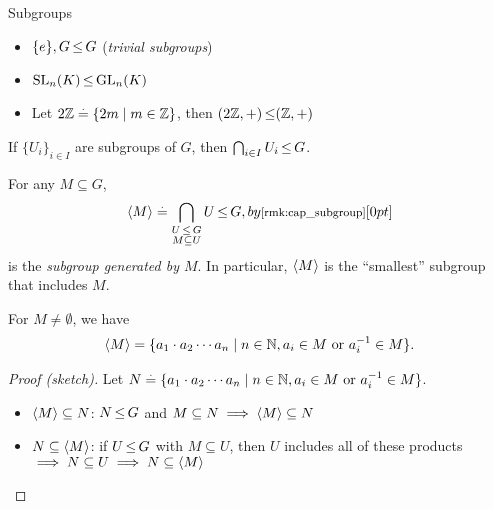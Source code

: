 \begin{ex}{Subgroups}{}
\begin{itemize}
    \item $\{e\}, G \operatorname*{\leq} G$ (\emph{trivial subgroups})
    \item $\mathrm{SL}_{n}(K) \operatorname*{\leq} \mathrm{GL}_{n}(K)$
    \item Let $2\mathbb{Z} \overset{.}{=} \{2m \mid m \in \mathbb{Z}\}$, then $(2\mathbb{Z},+) \operatorname*{\leq} (\mathbb{Z},+)$
\end{itemize}
\end{ex}

\begin{rmk}\label{rmk:cap_subgroup}
If $\{U_i\}_{i \in I}$ are subgroups of $G$, then $\bigcap_{i \in I} U_i \operatorname*{\leq} G$.
\end{rmk}

\begin{defn}
For any $M \subseteq G$, \begin{align}
    \gen{M} \defeq \bigcap_{\substack{U \subgroup G \\ M \subseteq U}} U \subgroup G, \margintag{by \cref{rmk:cap_subgroup}}
\end{align} is the \emph{subgroup generated by $M$}. In particular, $\langle M \rangle$ is the ``smallest'' subgroup that includes $M$.
\end{defn}

\begin{lem}
For $M \neq \emptyset$, we have \begin{align}
    \langle M \rangle = \{a_1 \cdot a_2 \cdots a_n \mid n \in \mathbb{N}, \text{$a_i \in M$ or $a_i^{-1} \in M$}\}.
\end{align}
\end{lem} \begin{proof}[Proof (sketch)]\leavevmode
Let $N \overset{.}{=} \{a_1 \cdot a_2 \cdots a_n \mid n \in \mathbb{N}, \text{$a_i \in M$ or $a_i^{-1} \in M$}\}$.
\begin{itemize}
    \item \underline{$\langle M \rangle \subseteq N$}: $N \operatorname*{\leq} G$ and $M \subseteq N \implies \langle M \rangle \subseteq N$ 
    \item \underline{$N \subseteq \langle M \rangle$}: if $U \operatorname*{\leq} G$ with $M \subseteq U$, then $U$ includes all of these products $\implies N \subseteq U \implies N \subseteq \langle M \rangle$ \qedhere
\end{itemize}
\end{proof}

